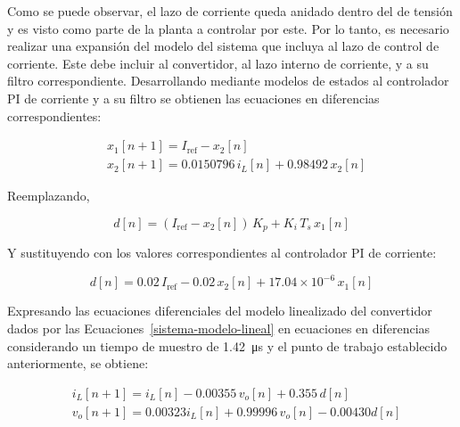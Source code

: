 Como se puede observar, el lazo de corriente queda anidado dentro del de tensión y es visto como parte de la planta a controlar por este. Por lo tanto, es necesario realizar una expansión del modelo del sistema que incluya al lazo de control de corriente. Este debe incluir al convertidor, al lazo interno de corriente, y a su filtro correspondiente. Desarrollando mediante modelos de estados al controlador PI de corriente y a su filtro se obtienen las ecuaciones en diferencias correspondientes:

\begin{equation*}
  \begin{split}
    & x_1\left[n+1\right] = I_{\mathrm{ref}} - x_2\left[n\right]
    \\
    & x_2\left[n+1\right] = 0.0150796 \, i_L\left[n\right] + 0.98492 \, x_2\left[n\right]
  \end{split}
  \label{ecuaciones-extra}
\end{equation*}

Reemplazando,

\begin{equation*}
  d\left[n\right] = \left( I_{\mathrm{ref}} - x_2\left[n\right] \right) \, K_p + K_i \, T_s \, x_1\left[n\right]
\end{equation*}

Y sustituyendo con los valores correspondientes al controlador PI de corriente:

\begin{equation*}
  d\left[n\right] = 0.02 \, I_{\mathrm{ref}} -  0.02\, x_2\left[n\right] + 17.04 \times 10^{-6} \, x_1\left[n\right]
  \label{ecuacion-extra}
\end{equation*}

Expresando las ecuaciones diferenciales del modelo linealizado del convertidor dados por las \mbox{Ecuaciones \ref{sistema-modelo-lineal}} en ecuaciones en diferencias considerando un tiempo de muestro de \SI{1.42}{\micro\second} y el punto de trabajo establecido anteriormente, se obtiene:

\begin{equation*}
  \begin{split}
    &i_L \left[n+1\right] = i_L\left[n\right] - 0.00355 \, v_o\left[n\right] + 0.355 \, d\left[n\right]
    \\
    & v_o\left[n+1\right] = 0.00323 i_L\left[n\right] + 0.99996 \, v_o\left[n\right] - 0.00430 d \left[n\right]
  \end{split}
  \label{ecuaciones-originales-expansion}
\end{equation*}

